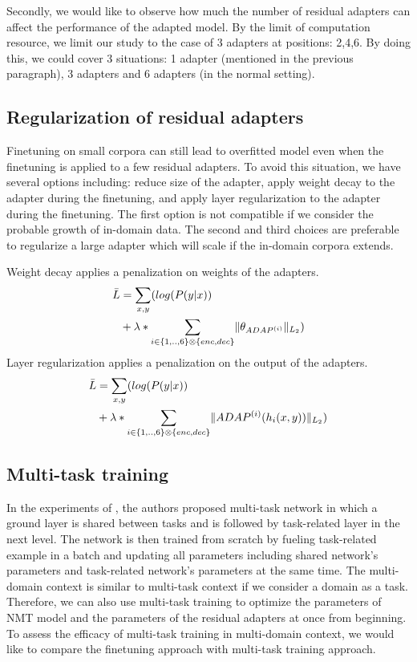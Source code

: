 \documentclass[11pt,a4paper]{article}
\begin{document}
Secondly, we would like to observe how much the number of residual adapters can affect the performance of the adapted model. By the limit of computation resource, we limit our study to the case of 3 adapters at positions: 2,4,6. By doing this, we could cover 3 situations: 1 adapter (mentioned in the previous paragraph), 3 adapters and 6 adapters (in the normal setting).

\subsection{Regularization of residual adapters \label{ssec:reg}}
Finetuning on small corpora can still lead to overfitted model even when the finetuning is applied to a few residual adapters. To avoid this situation, we have several options including: reduce size of the adapter, apply weight decay to the adapter during the finetuning, and apply layer regularization to the adapter during the finetuning. The first option is not compatible if we consider the probable growth of in-domain data. The second and third choices are preferable to regularize a large adapter which will scale if the in-domain corpora extends.

Weight decay applies a penalization on weights of the adapters.
\begin{equation}
\begin{split}
\bar{L} & = \mathop{\sum}_{x,y} (log(P(y|x)) \\
		  & + \lambda * \sum_{i \in \{1,..,6\} \otimes \{enc, dec\}} \normL{\theta_{ADAP^{(i)}}})
\end{split}
\end{equation}
Layer regularization applies a penalization on the output of the adapters.
\begin{equation}
\begin{split}
\bar{L} & = \mathop{\sum}_{x,y} (log(P(y|x)) \\
		  & + \lambda * \sum_{i \in \{1,..,6\} \otimes \{enc, dec\}} \normL{ADAP^{(i)}(h_i(x,y))})
\end{split}
\end{equation}

\subsection{Multi-task training\label{ssec:multitask}}
In the experiments of \cite{Caruana97multitask}, the authors proposed multi-task network in which a ground layer is shared between tasks and is followed by task-related layer in the next level. The network is then trained from scratch by fueling task-related example in a batch and updating all parameters including shared network's parameters and task-related network's parameters at the same time. The multi-domain context is similar to multi-task context if we consider a domain as a task. Therefore, we can also use multi-task training to optimize the parameters of NMT model and the parameters of the residual adapters at once from beginning. To assess the efficacy of multi-task training in multi-domain context, we would like to compare the finetuning approach with multi-task training approach.
\end{document}
